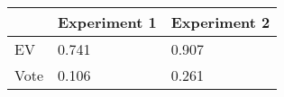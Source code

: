 \begin{tabular}{lll}
\hline 
  & Experiment 1 & Experiment 2 \\ 
\hline 
EV & 0.741 & 0.907 \\ 
Vote & 0.106 & 0.261 \\ 
\hline 
\end{tabular}